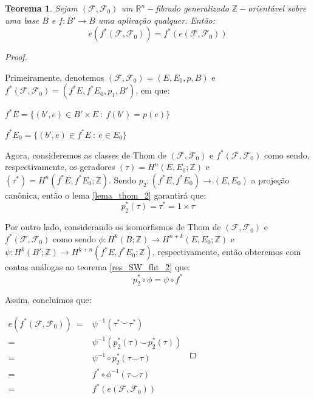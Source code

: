 \documentclass[12pt,oneside]{book} %
\newtheorem{teo}    {\hspace{0.5cm}Teorema}[chapter]
\newcommand{\R}{\mathbb{R}}
\newcommand{\Z}{\mathbb{Z}}
\newcommand{\ccup}{\smile}
\begin{document}
\begin{teo}\label{euler_pullback}
	Sejam $(\mathcal{F},\mathcal{F}_{0})$ um $\R^{n}-$fibrado generalizado $\Z-$orientável sobre uma base $B$ e $f:B'\to B$ uma aplicação qualquer. Então:
	$$ e\left( f^{*}(\mathcal{F},\mathcal{F}_{0}) \right)=f^{*}\left( e(\mathcal{F},\mathcal{F}_{0}) \right) $$
\end{teo}
\begin{proof}
	
	\
	
	\par Primeiramente, denotemos $(\mathcal{F},\mathcal{F}_{0})=(E,E_{0},p,B)$ e $f^{*}(\mathcal{F},\mathcal{F}_{0})=(f^{*}E,f^{*}E_{0},p_{1},B')$, em que: \newline
	
	$f^{*}E=\{ (b',e)\in B'\times E \ : \ f(b')=p(e) \}$
	
	$f^{*}E_{0}=\{ (b',e)\in f^{*}E \ : \ e\in E_{0} \}$ \newline
	
	\par Agora, consideremos as classes de Thom de $(\mathcal{F},\mathcal{F}_{0})$ e $f^{*}(\mathcal{F},\mathcal{F}_{0})$ como sendo, respectivamente, os geradores $(\tau)=H^{n}(E,E_{0};\Z)$ e $(\tau^{*})=H^{n}(f^{*}E,f^{*}E_{0};\Z)$. Sendo $p_{2}:(f^{*}E,f^{*}E_{0})\to (E,E_{0})$ a projeção canônica, então o lema \ref{lema_thom_2} garantirá que:
	$$ p_{2}^{*}(\tau)=\tau^{*}=1\times\tau $$
	
	\par Por outro lado, considerando os isomorfismos de Thom de $(\mathcal{F},\mathcal{F}_{0})$ e $f^{*}(\mathcal{F},\mathcal{F}_{0})$ como sendo $\phi:H^{k}(B;\Z)\to H^{n+k}(E,E_{0};\Z)$ e $\psi:H^{k}(B';\Z)\to H^{k+n}(f^{*}E,f^{*}E_{0};\Z)$, respectivamente, então obteremos com contas análogas ao teorema \ref{res_SW_fht_2} que:
	$$ p_{2}^{*}\circ \phi=\psi\circ f^{*} $$
	
	\par Assim, concluímos que: \newline
	
	$\begin{array}{rl}
		e\left( f^{*}(\mathcal{F},\mathcal{F}_{0}) \right) \ = & \psi^{-1}(\tau^{*}\ccup\tau^{*}) \\
		= & \psi^{-1}(p_{2}^{*}(\tau)\ccup p_{2}^{*}(\tau)) \\
		= & \psi^{-1}\circ p_{2}^{*}(\tau\ccup\tau) \\
		= & f^{*}\circ\phi^{-1}(\tau\ccup\tau) \\
		= & f^{*}\left( e(\mathcal{F},\mathcal{F}_{0}) \right)
	\end{array}$
	
\end{proof}
\end{document}
